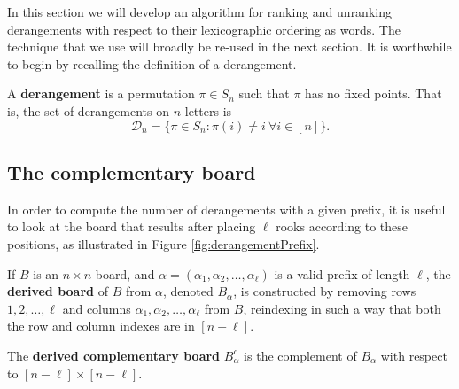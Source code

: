 In this section we will develop an algorithm for ranking and unranking
derangements with respect to their lexicographic ordering as words. The
technique that we use will broadly be re-used in the next section.
It is worthwhile to begin by recalling the definition of a derangement.
\begin{definition}
  A \textbf{derangement} is a permutation $\pi \in S_n$ such that $\pi$ has no
  fixed points. That is, the set of derangements on $n$ letters is \begin{equation}
    \mathcal{D}_n = \{\pi \in S_n : \pi(i) \neq i\ \forall i \in [n]\}.
  \end{equation}
\end{definition}

\subsection{The complementary board}
In order to compute the number of derangements with a given prefix, it is
useful to look at the board that results after placing $\ell$ rooks according to
these positions, as illustrated in Figure \ref{fig:derangementPrefix}.



\begin{definition}
  If $B$ is an $n \times n$ board, and
  $\alpha = (\alpha_1, \alpha_2, \dots, \alpha_\ell)$ is a valid prefix of length
  $\ell$, the \textbf{derived board} of $B$ from $\alpha$,
  denoted $B_\alpha$,
  is constructed by removing
  rows $1, 2, \dots, \ell$ and
  columns $\alpha_1, \alpha_2, \dots, \alpha_\ell$ from $B$,
  reindexing in such a way that both the row and column indexes are in
  $[n - \ell]$.

  The \textbf{derived complementary board} $B_\alpha^c$ is the complement of
  $B_\alpha$ with respect to $[n - \ell] \times [n - \ell]$.
\end{definition}


